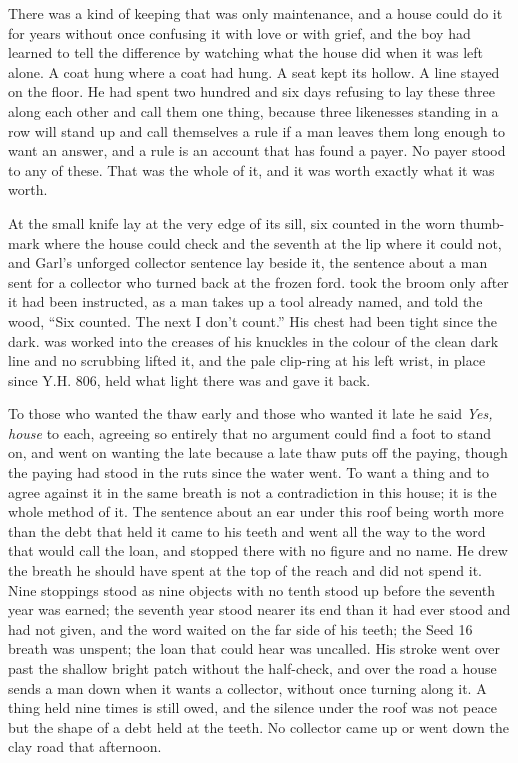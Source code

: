 There was a kind of keeping that was only maintenance, and a house could do it for years without once confusing it with love or with grief, and the boy had learned to tell the difference by watching what the house did when it was left alone. A coat hung where a coat had hung. A seat kept its hollow. A line stayed on the floor. He had spent two hundred and six days refusing to lay these three along each other and call them one thing, because three likenesses standing in a row will stand up and call themselves a rule if a man leaves them long enough to want an answer, and a rule is an account that has found a payer. No payer stood to any of these. That was the whole of it, and it was worth exactly what it was worth.

\scenebreak

At  the small knife lay at the very edge of its sill, six counted in the worn thumb-mark where the house could check and the seventh at the lip where it could not, and Garl's unforged collector sentence lay beside it, the sentence about a man sent for a collector who turned back at the frozen ford.  took the broom only after it had been instructed, as a man takes up a tool already named, and told the wood, “Six counted. The next I don't count.” His chest had been tight since the dark.  was worked into the creases of his knuckles in the colour of the clean dark line and no scrubbing lifted it, and the pale clip-ring at his left wrist, in place since Y.H. 806, held what light there was and gave it back.

To those who wanted the thaw early and those who wanted it late he said \emph{Yes, house} to each, agreeing so entirely that no argument could find a foot to stand on, and went on wanting the late because a late thaw puts off the paying, though the paying had stood in the ruts since the water went. To want a thing and to agree against it in the same breath is not a contradiction in this house; it is the whole method of it. The sentence about an ear under this roof being worth more than the debt that held it came to his teeth and went all the way to the word that would call the loan, and stopped there with no figure and no name. He drew the breath he should have spent at the top of the reach and did not spend it. Nine stoppings stood as nine objects with no tenth stood up before the seventh year was earned; the seventh year stood nearer its end than it had ever stood and had not given, and the word waited on the far side of his teeth; the Seed 16 breath was unspent; the loan that could hear was uncalled. His stroke went over  past the shallow bright patch without the half-check, and over the road a house sends a man down when it wants a collector, without once turning along it. A thing held nine times is still owed, and the silence under the roof was not peace but the shape of a debt held at the teeth. No collector came up or went down the clay road that afternoon.

